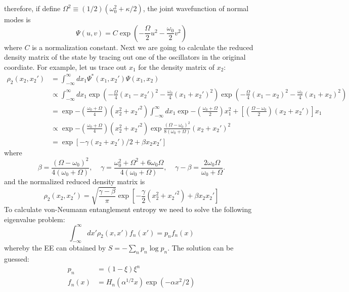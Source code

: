 \documentclass[letterpaper,prb,superscriptaddress]{revtex4}
\theoremstyle{definition}
\begin{document}
therefore, if define $\Omega^2 \equiv (1/2)(\omega_0^2 + \kappa/2)$,  the joint wavefunction of normal modes is
\begin{equation}
	\Psi(u,v) = C \exp(-\frac{\Omega}{2}u^2-\frac{\omega_0}{2}v^2)
\end{equation}
where $C$ is a normalization constant. 
Next we are going to calculate the reduced density matrix of the state by tracing out one of the oscillators in the original coordiate. For example, let us trace out $x_1$ for the density matrix of  $x_2$:
\begin{equation}
	\begin{split}
		\rho_2(x_2, x_2') &= \int_{-\infty}^{\infty} dx_1 \Psi^*(x_1,x_2') \Psi(x_1,x_2) \\
			    &\propto \int_{-\infty}^{\infty} dx_1 \exp(-\frac{\Omega}{4}(x_1 - x_2')^2 - \frac{\omega_0}{4}(x_1 + x_2')^2) \exp(-\frac{\Omega}{4}(x_1 - x_2)^2 - \frac{\omega_0}{4}(x_1 + x_2)^2)\\
			    &= \exp{-\left(\frac{\omega_0 + \Omega}{4}\right)(x_2^2 + x_2'^2)}\int_{-\infty}^{\infty} dx_1 \exp{- \left( \frac{\omega_0 + \Omega}{2} \right)x_1^2 + \left[ \left( \frac{\Omega - \omega_0}{2} \right)(x_2 + x_2')\right]x_1} \\
			    &\propto  \exp{-\left(\frac{\omega_0 + \Omega}{4}\right)(x_2^2 + x_2'^2)} \exp{\frac{(\Omega - \omega_0)^2}{8(\omega_0 + \Omega)}(x_2 + x_2')^2}\\
			    &= \exp[-\gamma(x_2 + x_2')/2 + \beta x_2 x_2']
	\end{split}
\end{equation}
where
\[
	\beta = \frac{(\Omega - \omega_0)^2}{4(\omega_0 + \Omega)}, \;\;\;\;\gamma = \frac{\omega_0^2 + \Omega^2 + 6 \omega_0 \Omega}{4(\omega_0 + \Omega)}, \;\;\;\;\gamma - \beta = \frac{2\omega_0\Omega}{\omega_0 + \Omega}
.\] 
and the normalized reduced density matrix is
\begin{equation}
	\rho_2(x_2, x_2') = \sqrt{\frac{\gamma - \beta}{\pi}}\exp[-\frac{\gamma}{2}(x_2^2 + x_2'^2) + \beta x_2 x_2']
\end{equation}
To calculate von-Neumann entanglement entropy we need to solve the following eigenvalue problem:
\begin{equation}
	\int_{-\infty}^{\infty} dx' \rho_2(x,x') f_n(x') = p_n f_n(x)
\end{equation}
whereby the EE can obtained by $S = - \sum_{n} p_n \log p_n $. The solution can be guessed:
\begin{align}
	p_n &= (1 - \xi) \xi^n \\
	f_n(x) &= H_n(\alpha^{1/2}x) \exp(-\alpha x^2 /2)
\end{align}
\end{document}
